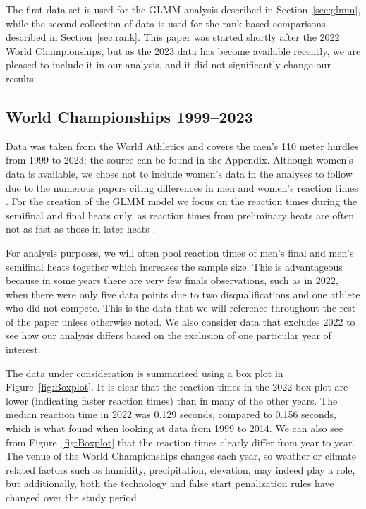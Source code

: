 \documentclass[12pt, letterpaper, titlepage]{article}
\begin{document}
The first data set is used for the GLMM analysis described in 
Section~\ref{sec:glmm}, while the second collection of data is used for the 
rank-based comparisons described in Section~\ref{sec:rank}.  This paper was
started shortly after the 2022 World Championships, but as the 2023 data has 
become available recently, we are pleased to include it in our analysis, and it
did not significantly change our results.


\subsection{World Championships 1999--2023}\label{sec:dataworld}


Data was taken from the World Athletics 
and covers the men's 110 meter hurdles from 1999 to 2023; the source can be 
found in the Appendix.
Although women's data is available, we chose not to include women's data in the
analyses to follow due to the numerous papers citing differences in men and
women's reaction times \citep[e.g.,][]{lipps2011implications, 
babicc2009reaction, panoutsakopoulos2020gender}.
For the creation of the GLMM model we focus on the reaction times during the 
semifinal and final heats only, as reaction times from preliminary heats are 
often not as fast as those in later heats \citep[e.g.,][]{zhang2021correlation}. 


For analysis purposes, we will often pool reaction times of men's final and 
men's semifinal heats together which increases the sample size. This is 
advantageous because in some years there are very few finals observations, such
as in 2022, when there were only five data points due to two disqualifications 
and one athlete who did not compete.  This is the data that we will reference
throughout the rest of the paper unless otherwise noted. We also consider data 
that excludes 2022 to see how our analysis differs based on the exclusion of one
particular year of interest.


The data under consideration is summarized using a box plot in 
Figure~\ref{fig:Boxplot}.  It is clear that the reaction times in the 2022
box plot are lower (indicating faster reaction times) than in many of the other
years.  The median reaction time in 2022 was 0.129 seconds,  compared to 0.156
seconds, which is what \citet{brosnan2017effects} found when looking at data
from 1999 to 2014. We can also see from Figure~\ref{fig:Boxplot} that the 
reaction times clearly differ from year to year. The venue of the World 
Championships changes each year, so weather or climate related factors such as 
humidity, precipitation, elevation, may indeed play a role, but additionally,
both the technology and false start penalization rules have changed over the 
study period.
\end{document}
